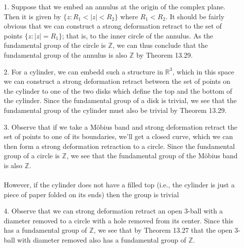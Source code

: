 \documentclass[a4paper,12pt,twoside]{hmcpset}
\begin{document}
\begin{solution}
    \begin{itemize}
        \item[1.] Suppose that we embed an annulus at the origin of the complex
        plane. Then it is given by $\{z : R_1 < |z| < R_2\}$ where
        $R_1 < R_2$. It should be fairly obvious that we can construct
        a strong deformation retract
        to the set of points $\{z : |z| = R_1\}$; that is, to the
        inner circle of the annulus. As the fundamental group of the
        circle is $\mathbb{Z}$, we can thus conclude that the
        fundamental group of the annulus is also $\mathbb{Z}$ by
        Theorem 13.29.

        \item[2.] For a cylinder, we can embedd such a structure in
        $\mathbb{R}^3$, which in this space we can construct a
        strong deformation retract between the set of points on the
        cylinder to one of the two disks which define the top and
        the bottom of the cylinder. Since the fundamental group of a
        disk is trivial, we see that the fundamental group of the
        cylinder must also be trivial by Theorem 13.29.

        \item[3.] Observe that if we take a Möbius band and strong
        deformation retract the set of points to one of its
        boundaries, we'll get a closed curve, which we can then form a
        strong deformation retraction to a circle. Since the
        fundamental group of a circle is $\mathbb{Z}$, we see that the
        fundamental group of the Möbius band is also $\mathbb{Z}$. 
        \\
        \\
        However, if the cylinder does not have a filled top (i.e., the
        cylinder is just a piece of paper folded on its ends) then the
        group is trivial 

        \item[4.] Observe that we can strong deformation retract an
        open 3-ball with a diameter removed to a circle with a hole
        removed from its center. Since this has a fundamental group of
        $\mathbb{Z}$, we see that by Theorem 13.27 that the open
        3-ball with diameter removed also has a fundamental group of 
        $\mathbb{Z}$.

    \end{itemize}

\end{solution}
\end{document}

